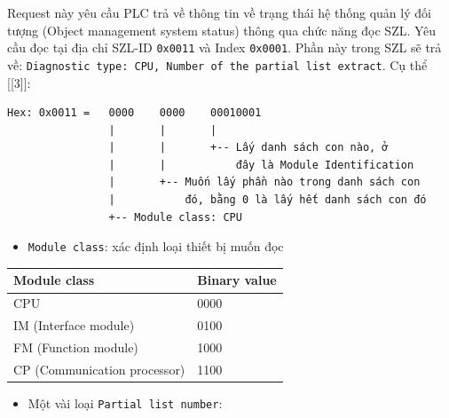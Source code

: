 \documentclass[../main.tex]{subfiles}
\begin{document}
\begin{enumerate}
Request này yêu cầu PLC trả về thông tin về trạng thái hệ thống quản lý đối tượng (Object management system status) thông qua chức năng đọc SZL. Yêu cầu đọc tại địa chỉ SZL-ID \texttt{0x0011} và Index \texttt{0x0001}. Phần này trong SZL sẽ trả về: \texttt{Diagnostic type: CPU, Number of the partial list extract}. Cụ thể [[3]]:




\begin{verbatim}
Hex: 0x0011 =   0000    0000    00010001
                |       |       |
                |       |       +-- Lấy danh sách con nào, ở 
                |       |           đây là Module Identification
                |       +-- Muốn lấy phần nào trong danh sách con 
                |           đó, bằng 0 là lấy hết danh sách con đó
                +-- Module class: CPU
\end{verbatim}


\begin{itemize}
    \item \texttt{Module class}: xác định loại thiết bị muốn đọc
\end{itemize}


\begin{table}[H]
    \centering
    \footnotesize
    \begin{tabular}{|l|l|}
        \hline
        \textbf{Module class} & \textbf{Binary value} \\
        \hline
        CPU & 0000 \\
        \hline
        IM (Interface module) & 0100 \\
        \hline
        FM (Function module) & 1000 \\
        \hline
        CP (Communication processor) & 1100 \\
        \hline
    \end{tabular}
\end{table}


\begin{itemize}
    \item Một vài loại \texttt{Partial list number}:
\end{itemize}



\end{enumerate}
\end{document}

